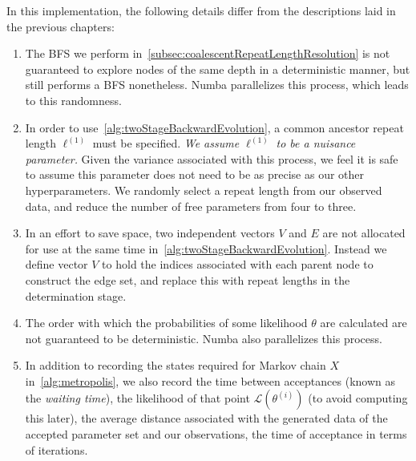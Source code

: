 In this implementation, the following details differ from the descriptions laid in the previous chapters:
\begin{enumerate}
    \item The BFS we perform in~\autoref{subsec:coalescentRepeatLengthResolution} is not guaranteed to explore nodes
        of the same depth in a deterministic manner, but still performs a BFS nonetheless.
        Numba parallelizes this process, which leads to this randomness.
    \item In order to use~\autoref{alg:twoStageBackwardEvolution}, a common ancestor repeat length $\ell^{(1)}$ must be
        specified.
        \emph{We assume $\ell^{(1)}$ to be a nuisance parameter.}
        Given the variance associated with this process, we feel it is safe to assume this parameter does not need to be
        as precise as our other hyperparameters.
        We randomly select a repeat length from our observed data, and reduce the number of free parameters from
        four to three.
    \item In an effort to save space, two independent vectors $V$ and $E$ are not allocated for use at the same time
        in~\autoref{alg:twoStageBackwardEvolution}.
        Instead we define vector $V$ to hold the indices associated with each parent node to construct the edge set,
        and replace this with repeat lengths in the determination stage.
    \item The order with which the probabilities of some likelihood $\mathcal{\theta}$ are calculated are
        not guaranteed to be deterministic.
        Numba also parallelizes this process.
    \item In addition to recording the states required for Markov chain $X$ in~\autoref{alg:metropolis}, we also record
        the time between acceptances (known as the \emph{waiting time}), the likelihood of that point
        $\mathcal{L}(\theta^{(i)})$ (to avoid computing this later), the average distance associated with the generated
        data of the accepted parameter set and our observations, the time of acceptance in terms of iterations.
\end{enumerate}

